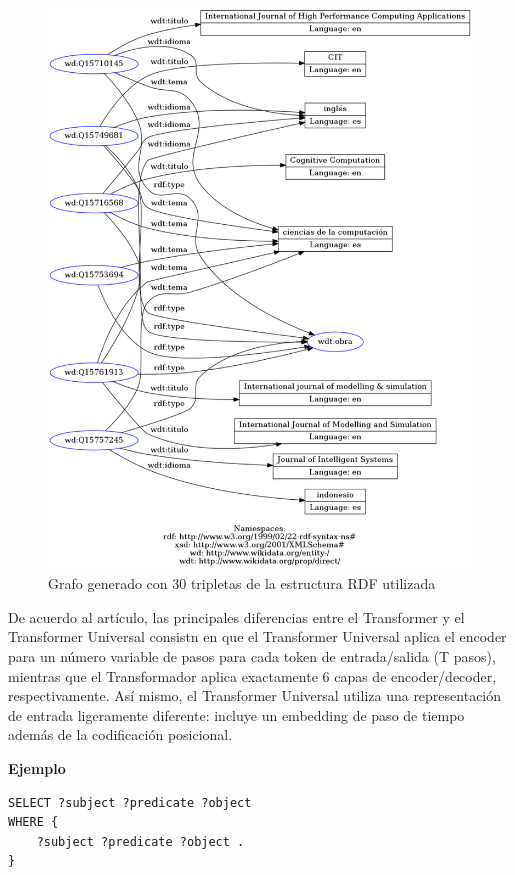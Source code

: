 \documentclass[conference]{IEEEtran}
\begin{document}
\begin{figure}[H]
\includegraphics[scale=0.25]{imagenes/grafo_rdf_30.jpeg} 
\caption{Grafo generado con 30 tripletas de la estructura RDF utilizada \cite{b2}}
\end{figure} 

\vspace{0.2cm}

De acuerdo al art\'iculo, las principales diferencias entre el Transformer y el Transformer Universal consistn en que el Transformer Universal aplica el encoder para un n\'umero variable de pasos para cada token de entrada/salida (T pasos), mientras que el Transformador aplica exactamente $6$ capas de encoder/decoder, respectivamente. As\'i mismo, el Transformer Universal utiliza una representaci\'on de entrada ligeramente diferente: incluye un embedding de paso de tiempo adem\'as de la codificaci\'on posicional.

\textbf{Ejemplo}
\begin{lstlisting}[captionpos=b, caption=SPARQL query, label=lst:sparql,
basicstyle=\ttfamily,frame=single]
SELECT ?subject ?predicate ?object
WHERE {
	?subject ?predicate ?object .
}
\end{lstlisting}
\end{document}
